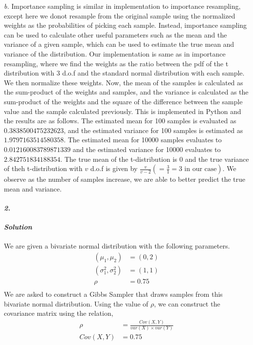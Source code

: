 \documentclass[11pt]{article}
\begin{document}
\noindent \emph{b.} Importance sampling is similar in implementation to importance resampling, except here we donot resample from the original sample using the normalized weights as the probabilities of picking each sample. Instead, importance sampling can be used to calculate other useful parameters such as the mean and the variance of a given sample, which can be used to estimate the true mean and variance of the distribution. Our implementation is same as in importance resampling, where we find the weights as the ratio between the pdf of the t distribution with 3 d.o.f and the standard normal distribution with each sample. We then normalize these weights. Now, the mean of the samples is calculated as the sum-product of the weights and samples, and the variance is calculated as the sum-product of the weights and the square of the difference between the sample value and the sample calculated previously. This is implemented in Python and the results are as follows. The estimated mean for 100 samples is evaluated as $0.3838500475232623$, and the estimated variance for 100 samples is estimated as $1.9797163514580358$. The estimated mean for 10000 samples evaluates to $0.012160083789871339$ and the estimated variance for 10000 evaluates to $2.842751834188354$. The true mean of the t-distribution is 0 and the true variance of theh t-distribution with $v$ d.o.f is given by $\frac{v}{v-2} (= \frac{3}{1} = 3 \text{ in our case})$. We observe as the number of samples increase, we are able to better predict the true mean and variance.\\ \\
\textbf{\emph{2.}} \\ \\
\textbf{\emph{Solution}}\\ \\
We are given a bivariate normal distribution with the following parameters.
\begin{equation}
  \nonumber
  \begin{aligned}
    (\mu_{1}, \mu_{2}) & = (0,2)\\
    (\sigma_{1}^{2}, \sigma_{2}^{2}) & = (1,1)\\
    \rho & = 0.75\\
  \end{aligned}
\end{equation}
We are asked to construct a Gibbs Sampler that draws samples from this bivariate normal distribution. Using the value of $\rho$, we can construct the covariance matrix using the relation,
\begin{equation}
  \nonumber
  \begin{aligned}
    \rho & = \frac{Cov(X, Y)}{var(X) \times var(Y)}\\
    Cov(X, Y) & = 0.75
  \end{aligned}
\end{equation}
\end{document}
